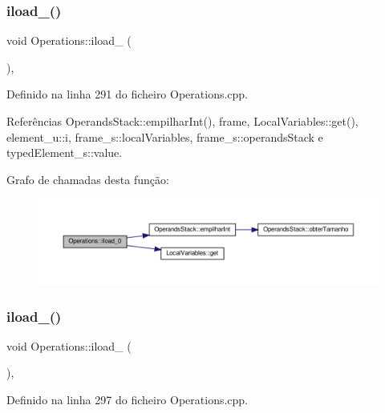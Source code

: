 \subsubsection{\texorpdfstring{iload\+\_()}{iload\_0()}}
{\footnotesize\ttfamily void Operations\+::iload\+\_ (\begin{DoxyParamCaption}{ }\end{DoxyParamCaption})\hspace{0.3cm}{\ttfamily [static]}, {\ttfamily [private]}}



Definido na linha 291 do ficheiro Operations.\+cpp.



Referências Operands\+Stack\+::empilhar\+Int(), frame, Local\+Variables\+::get(), element\+\_\+u\+::i, frame\+\_\+s\+::local\+Variables, frame\+\_\+s\+::operands\+Stack e typed\+Element\+\_\+s\+::value.

Grafo de chamadas desta função\+:
\nopagebreak
\begin{figure}[H]
\begin{center}
\leavevmode
\includegraphics[width=350pt]{classOperations_a3aba059cf78681767c141d27989fc2aa_cgraph}
\end{center}
\end{figure}
\mbox{\label{classOperations_a4b9d8ef21894c0db2203c06712e97765}} 
\subsubsection{\texorpdfstring{iload\+\_()}{iload\_1()}}
{\footnotesize\ttfamily void Operations\+::iload\+\_ (\begin{DoxyParamCaption}{ }\end{DoxyParamCaption})\hspace{0.3cm}{\ttfamily [static]}, {\ttfamily [private]}}



Definido na linha 297 do ficheiro Operations.\+cpp.



